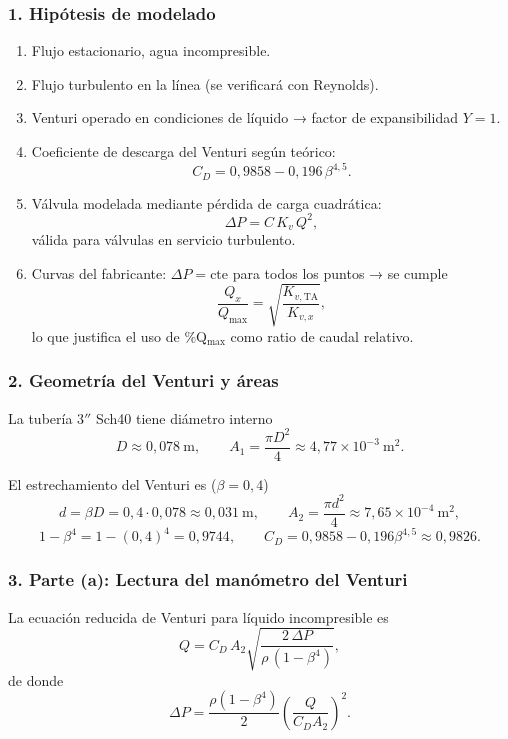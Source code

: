\documentclass[12pt, a4paper]{article}
\begin{document}
\subsubsection*{1. Hipótesis de modelado}
\begin{enumerate}
  \item Flujo estacionario, agua incompresible.
  \item Flujo turbulento en la línea (se verificará con Reynolds).
  \item Venturi operado en condiciones de líquido → factor de expansibilidad $Y=1$.
  \item Coeficiente de descarga del Venturi según teórico: 
        \[
        C_D = 0{,}9858 - 0{,}196\,\beta^{4{,}5}.
        \]
  \item Válvula modelada mediante pérdida de carga cuadrática:
        \[
        \Delta P = C\,K_v\,Q^2,
        \]
        válida para válvulas en servicio turbulento.
  \item Curvas del fabricante: $\Delta P = \text{cte}$ para todos los puntos → 
        se cumple
        \[
        \frac{Q_x}{Q_{\max}}
        = \sqrt{\frac{K_{v,\mathrm{TA}}}{K_{v,x}}},
        \]
        lo que justifica el uso de \%Q\(_{\max}\) como ratio de caudal relativo.
\end{enumerate}

\subsubsection*{2. Geometría del Venturi y áreas}
La tubería $3''$ Sch40 tiene diámetro interno
\[
D \approx 0{,}078\ \text{m},
\qquad
A_1 = \frac{\pi D^2}{4}
    \approx 4{,}77\times 10^{-3}\ \text{m}^2.
\]

El estrechamiento del Venturi es ($\beta = 0{,}4$)
\[
d = \beta D = 0{,}4\cdot 0{,}078 \approx 0{,}031\ \text{m},
\qquad
A_2 = \frac{\pi d^2}{4} \approx 7{,}65\times 10^{-4}\ \text{m}^2,
\]
\[
1-\beta^4 = 1 - (0{,}4)^4 = 0{,}9744,
\qquad
C_D = 0{,}9858 - 0{,}196\beta^{4{,}5} \approx 0{,}9826.
\]

\subsubsection*{3. Parte (a): Lectura del manómetro del Venturi}

La ecuación reducida de Venturi para líquido incompresible es
\[
Q = C_D\,A_2
\sqrt{\frac{2\,\Delta P}{\rho\,(1-\beta^4)}},
\]
de donde
\[
\Delta P
= 
\frac{\rho (1-\beta^4)}{2}
\left(\frac{Q}{C_D A_2}\right)^2.
\]
\end{document}
